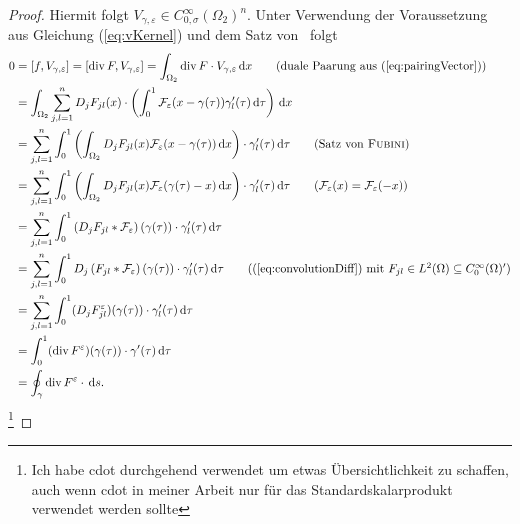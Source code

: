 \begin{proof}
  Hiermit folgt $V_{\gamma,\varepsilon} \in C_{0,\sigma}^\infty(\Omega_2)^n$.
  Unter Verwendung der Voraussetzung aus Gleichung (\ref{eq:vKernel}) und dem Satz von \fubini\ folgt
  \begingroup
  \addtolength{\jot}{1em}
  \begin{align*}
    0
    &= [f, V_{\gamma, \varepsilon}] %
    = [\div F, V_{\gamma, \varepsilon}] %
    = \int_{\Omega_2} \div F \cdot V_{\gamma, \varepsilon} \d x \tag{duale Paarung aus (\ref{eq:pairingVector})} \\
    &= \int_{\Omega_2} \sum_{j,l=1}^n D_j F_{jl}(x) \cdot \left( \int_0^1 \mathcal{F}_\varepsilon(x - \gamma(\tau))\gamma_l'(\tau) \d\tau \right) \d x \\
    &= \sum_{j,l=1}^n \int_0^1 \left(\int_{\Omega_2}  D_j F_{jl}(x) \mathcal{F}_\varepsilon(x - \gamma(\tau))\d x \right) \cdot \gamma_l'(\tau) \d\tau \tag{Satz von \fubini}\\
    &= \sum_{j,l=1}^n \int_0^1 \left(\int_{\Omega_2}  D_j F_{jl}(x) \mathcal{F}_\varepsilon(\gamma(\tau) - x)\d x \right) \cdot \gamma_l'(\tau) \d\tau \tag{$\mathcal{F}_\varepsilon(x) = \mathcal{F}_\varepsilon(-x)$}\\
    &= \sum_{j,l=1}^n \int_0^1 \left(D_j F_{jl} \ast \mathcal{F}_\varepsilon\right)(\gamma(\tau)) \cdot \gamma_l'(\tau) \d\tau \\
    &= \sum_{j,l=1}^n \int_0^1 D_j\left(F_{jl} \ast \mathcal{F}_\varepsilon\right)(\gamma(\tau)) \cdot \gamma_l'(\tau) \d\tau \tag{(\ref{eq:convolutionDiff}) mit $F_{jl} \in L^2(\Omega) \subseteq C_0^\infty(\Omega)'$}\\
    &= \sum_{j,l=1}^n \int_0^1 (D_j F_{jl}^\varepsilon)(\gamma(\tau)) \cdot \gamma_l'(\tau) \d\tau \\
    &= \int_0^1 (\div F^\varepsilon)(\gamma(\tau)) \cdot \gamma'(\tau) \d\tau \\
    &= \oint_\gamma \div F^\varepsilon \cdot \d s.
  \end{align*}
  \endgroup
  \footnote{Ich habe cdot durchgehend verwendet um etwas Übersichtlichkeit zu schaffen, auch wenn cdot in meiner Arbeit nur für das Standardskalarprodukt verwendet werden sollte}


\end{proof}
